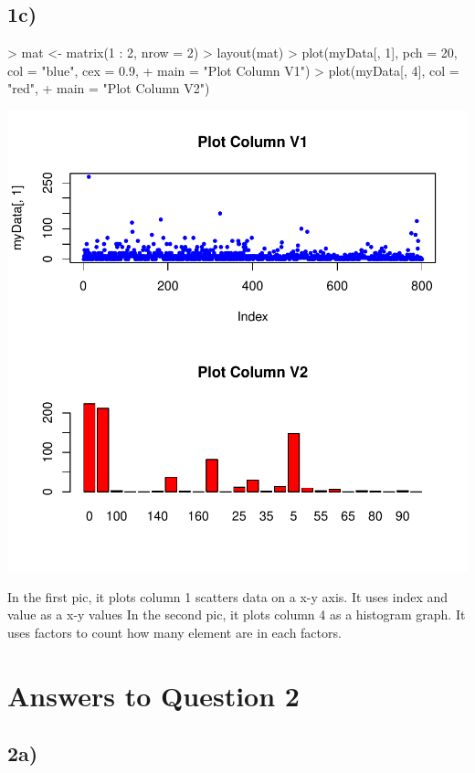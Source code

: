 \documentclass{article}
\begin{document}
\subsection*{1c)}
\begin{Schunk}
\begin{Sinput}
> mat <- matrix(1 : 2, nrow = 2)
> layout(mat)
> plot(myData[, 1], pch = 20, col = "blue", cex = 0.9,
+      main = "Plot Column V1")
> plot(myData[, 4], col = "red",
+      main = "Plot Column V2")
\end{Sinput}
\end{Schunk}
\includegraphics{Tricia-004}

In the first pic, it plots column 1 scatters data on a x-y axis. It uses index and value as a x-y values
In the second pic, it plots column 4 as a histogram graph. It uses factors to count how many element are in each factors.

\section*{Answers to Question 2}
\subsection*{2a)}
\end{document}
